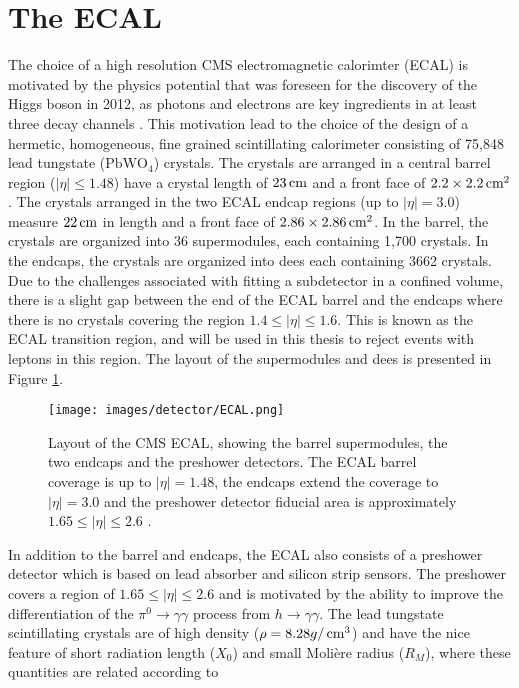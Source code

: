 \section{The ECAL}
\noindent\justify
The choice of a high resolution CMS electromagnetic calorimter (ECAL) is motivated by the physics potential that was foreseen for the discovery of the Higgs boson in 2012, as photons and electrons are key ingredients in at least three decay channels \cite{Cockerill:2008td}.
This motivation lead to the choice of the design of a hermetic, homogeneous, fine grained scintillating calorimeter consisting of 75,848 lead tungstate ($\mathrm{PbWO_{4}}$) crystals. 
The crystals are arranged in a central barrel region ($|\eta|\leq1.48$) have a crystal length of $23\,\text{cm}$ and a front face of $2.2\times2.2\,\text{cm}^{2}$. 
The crystals arranged in the two ECAL endcap regions (up to $|\eta|=3.0$) measure $22\,\text{cm}$ in length and a front face of $2.86\times2.86\,\text{cm}^{2}$. 
In the barrel, the crystals are organized into 36 supermodules, each containing 1,700 crystals. 
In the endcaps, the crystals are organized into dees each containing 3662 crystals. 
Due to the challenges associated with fitting a subdetector in a confined volume, there is a slight gap between the end of the ECAL barrel and the endcaps where there is no crystals covering the region $1.4\leq|\eta|\leq1.6$. This is known as the ECAL transition region, and will be used in this thesis to reject events with leptons in this region. 
The layout of the supermodules and dees is presented in Figure \ref{fig:ECAL}. 
\begin{figure}[!htp]
  \centering
   \texttt{[image: images/detector/ECAL.png]}
   \caption{Layout of the CMS ECAL, showing the barrel supermodules, the two endcaps and the preshower detectors. The ECAL barrel coverage is up to $|\eta|=1.48$, the endcaps extend the coverage to $|\eta|=3.0$ and the preshower detector fiducial area is approximately $1.65\leq|\eta|\leq2.6$ \cite{Chatrchyan:2013dga}.}
   \label{fig:ECAL}
\end{figure}                                                                                            
In addition to the barrel and endcaps, the ECAL also consists of a preshower detector which is based on lead absorber and silicon strip sensors. 
The preshower covers a region of $1.65\leq|\eta|\leq2.6$ and is motivated by the ability to improve the differentiation of the $\pi^{0}\rightarrow\gamma\gamma$ process from $h\rightarrow\gamma\gamma$. 
The lead tungstate scintillating crystals are of high density ($\rho=8.28g/\,\text{cm}^{3}$) and have the nice feature of short radiation length ($X_{0}$) and small Moli\`ere radius ($R_{M}$), where these quantities are related according to

